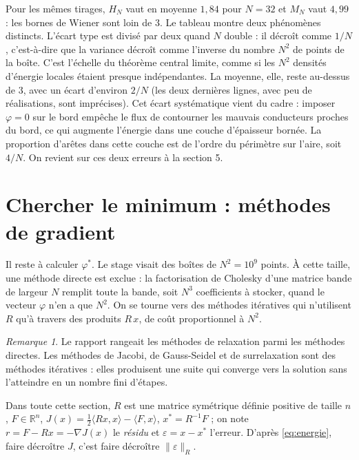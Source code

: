 \documentclass[11pt,a4paper]{article}
\theoremstyle{plain}
\theoremstyle{definition}
\theoremstyle{remark}
\newtheorem{remarque}[theoreme]{Remarque}
\newcommand{\R}{\mathbb{R}}
\newcommand{\ps}[2]{\langle #1,#2\rangle}
\begin{document}
Pour les mêmes tirages, $H_N$ vaut en moyenne $1{,}84$ pour $N=32$ et $M_N$ vaut $4{,}99$ : les bornes de Wiener sont loin de $3$. Le tableau montre deux phénomènes distincts. L'écart type est divisé par deux quand $N$ double : il décroît comme $1/N$, c'est-à-dire que la variance décroît comme l'inverse du nombre $N^2$ de points de la boîte. C'est l'échelle du théorème central limite, comme si les $N^2$ densités d'énergie locales étaient presque indépendantes. La moyenne, elle, reste au-dessus de $3$, avec un écart d'environ $2/N$ (les deux dernières lignes, avec peu de réalisations, sont imprécises). Cet écart systématique vient du cadre : imposer $\varphi=0$ sur le bord empêche le flux de contourner les mauvais conducteurs proches du bord, ce qui augmente l'énergie dans une couche d'épaisseur bornée. La proportion d'arêtes dans cette couche est de l'ordre du périmètre sur l'aire, soit $4/N$. On revient sur ces deux erreurs à la section 5.

\section{Chercher le minimum : méthodes de gradient}

Il reste à calculer $\varphi^*$. Le stage visait des boîtes de $N^2=10^9$ points. À cette taille, une méthode directe est exclue : la factorisation de Cholesky d'une matrice bande de largeur $N$ remplit toute la bande, soit $N^3$ coefficients à stocker, quand le vecteur $\varphi$ n'en a que $N^2$. On se tourne vers des méthodes itératives qui n'utilisent $R$ qu'à travers des produits $R\,x$, de coût proportionnel à $N^2$.

\begin{remarque}
Le rapport rangeait les méthodes de relaxation parmi les méthodes directes. Les méthodes de Jacobi, de Gauss-Seidel et de surrelaxation sont des méthodes itératives : elles produisent une suite qui converge vers la solution sans l'atteindre en un nombre fini d'étapes.
\end{remarque}

Dans toute cette section, $R$ est une matrice symétrique définie positive de taille $n$, $F\in\R^n$, $J(x)=\frac12\ps{Rx}{x}-\ps{F}{x}$, $x^*=R^{-1}F$ ; on note $r=F-Rx=-\nabla J(x)$ le \emph{résidu} et $\varepsilon=x-x^*$ l'erreur. D'après \eqref{eq:energie}, faire décroître $J$, c'est faire décroître $\|\varepsilon\|_R$.
\end{document}
